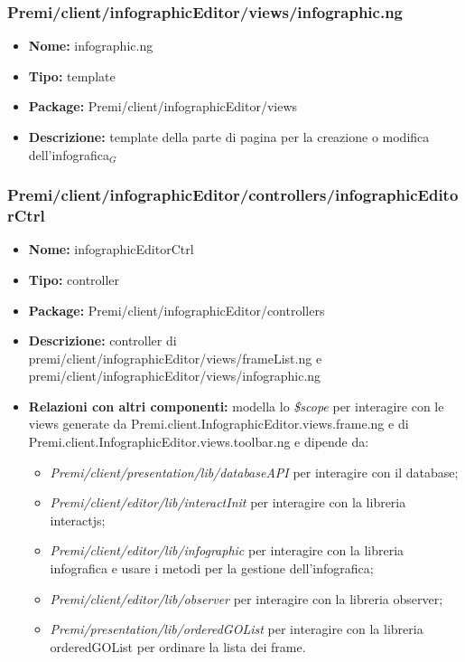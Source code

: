 \subsubsection{Premi/client/infographicEditor/views/infographic.ng}
\begin{itemize}
  \item[] \textbf{Nome:} infographic.ng
  \item[] \textbf{Tipo:} template
  \item[] \textbf{Package:} Premi/client/infographicEditor/views
  \item[] \textbf{Descrizione:}  template della parte di pagina per la creazione o modifica dell'infografica$_G$
\end{itemize}

\subsubsection{Premi/client/infographicEditor/controllers/infographicEditorCtrl}
\begin{itemize}
  \item[] \textbf{Nome:} infographicEditorCtrl
  \item[] \textbf{Tipo:} controller
  \item[] \textbf{Package:} Premi/client/infographicEditor/controllers
  \item[] \textbf{Descrizione:} controller di premi/client/infographicEditor/views/frameList.ng e premi/client/infographicEditor/views/infographic.ng
  \item[] \textbf{Relazioni con altri componenti:} modella lo \textit{\$scope} per interagire con le views generate da Premi.client.InfographicEditor.views.frame.ng e di Premi.client.InfographicEditor.views.toolbar.ng e dipende da: 
  \begin{itemize}  
  \item[] \textit{Premi/client/presentation/lib/databaseAPI} per interagire con il database;
  \item[] \textit{Premi/client/editor/lib/interactInit} per interagire con la libreria interactjs;
  \item[] \textit{Premi/client/editor/lib/infographic} per interagire con la libreria infografica e usare i metodi per la gestione dell'infografica;
  \item[] \textit{Premi/client/editor/lib/observer} per interagire con la libreria observer;
  \item[] \textit{Premi/presentation/lib/orderedGOList} per interagire con la libreria orderedGOList per ordinare la lista dei frame. 
  \end{itemize}
\end{itemize}

